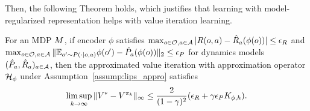 Then, the following Theorem holds, which justifies that learning with model-regularized representation helps with value iteration learning.
\begin{theorem}
\label{thm:error_avi}
For an MDP $M$, if encoder $\phi$ satisfies
$\max_{o\in\mathcal{O},a\in\mathcal{A}}|R(o,a) - \hat{R}_a(\phi(o)) | \leq \epsilon_R$ and
$\max_{o\in\mathcal{O},a\in\mathcal{A}} \| \mathbb{E}_{o^\prime\sim P(\cdot|o,a)} \phi(o^\prime) - \hat{P}_a (\phi(o)) \|_2 \leq \epsilon_P$ for dynamics models $(\hat{P}_a,\hat{R}_a)_{a\in\mathcal{A}}$, 
then the approximated value iteration with approximation operator $\mathcal{H}_{\phi}$ under Assumption~\ref{assump:lips_appro} satisfies 
\begin{equation}
    \limsup_{k\to\infty} \|V^* - V^{\pi_k} \|_{\infty} \leq \frac{2}{(1-\gamma)^2}(\epsilon_R+\gamma\epsilon_PK_{\phi,h}).
\end{equation}
\end{theorem}


